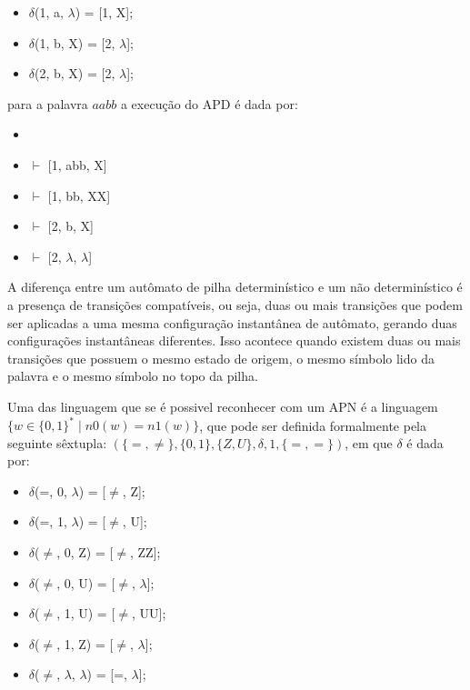 \begin{itemize}
    \item[] $\delta$(1, a, $\lambda$) = [1, X];
    \item[] $\delta$(1, b, X) = [2, $\lambda$];
    \item[] $\delta$(2, b, X) = [2, $\lambda$];
\end{itemize}

para a palavra $aabb$ a execução do APD é dada por:

\begin{itemize}
    \item[] [1, aabb, $\lambda$] 
    \item[] $\vdash$ [1, abb, X] 
    \item[] $\vdash$ [1, bb, XX] 
    \item[] $\vdash$ [2, b, X] 
    \item[] $\vdash$ [2, $\lambda$, $\lambda$]
\end{itemize}


A diferença entre um autômato de pilha determinístico e um não determinístico é a presença de transições compatíveis, ou seja, duas ou mais transições que podem ser aplicadas a uma mesma configuração instantânea de autômato, gerando duas configurações instantâneas diferentes. Isso acontece quando existem duas ou mais transições que possuem o mesmo estado de origem, o mesmo símbolo lido da palavra e o mesmo símbolo no topo da pilha.

Uma das linguagem que se é possivel reconhecer com um APN é a linguagem $\{w \in\{0,1\}^* \mid n0(w) = n1(w)\}$, que pode ser definida formalmente pela seguinte sêxtupla: $(\{=,\neq\},\{0,1\},\{Z,U\},\delta,1,\{=,=\})$, em que $\delta$ é dada por:

\begin{itemize}
    \item[] $\delta$(=, 0, $\lambda$) = [$\neq$, Z];
    \item[] $\delta$(=, 1, $\lambda$) = [$\neq$, U];
    \item[] $\delta$($\neq$, 0, Z) = [$\neq$, ZZ];
    \item[] $\delta$($\neq$, 0, U) = [$\neq$, $\lambda$];
    \item[] $\delta$($\neq$, 1, U) = [$\neq$, UU];
    \item[] $\delta$($\neq$, 1, Z) = [$\neq$, $\lambda$];
    \item[] $\delta$($\neq$, $\lambda$, $\lambda$) = [=, $\lambda$];
\end{itemize}

